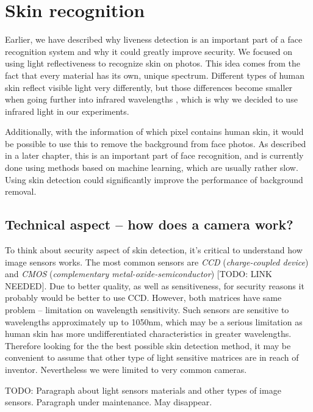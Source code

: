 \chapter{Skin recognition}
    Earlier, we have described why liveness detection is an important part
    of a face recognition system and why it could greatly improve security.
    We focused on using light reflectiveness to recognize skin on photos.
    This idea comes from the fact that every material has its own, unique spectrum.
    Different types of human skin reflect visible light very differently,
    but those differences become smaller when going further into infrared wavelengths
    \cite{visinfra} \cite{toyotaskin}, which is why we decided to use infrared light
    in our experiments.

    Additionally, with the information of which pixel contains human skin,
    it would be possible to use this to remove the background from face photos.
    As described in a later chapter, this is an important part of face recognition,
    and is currently done using methods based on machine learning, which are usually
    rather slow.
    Using skin detection could significantly improve the performance of background
    removal.

    \section{Technical aspect -- how does a camera work?}
        To think about security aspect of skin detection,
        it's critical to understand how image sensors works.
        The most common sensors are \textit{CCD} (\textit{charge-coupled device})
        and \textit{CMOS} (\textit{complementary metal-oxide-semiconductor})
        [TODO: LINK NEEDED].
        Due to better quality, as well as sensitiveness, for security reasons
        it probably would be better to use CCD.
        However, both matrices have same problem -- limitation on wavelength sensitivity.
        Such sensors are sensitive to wavelengths approximately up to 1050nm,
        which may be a serious limitation as human skin has more undifferentiated
        characteristics in greater wavelengths.
        Therefore looking for the the best possible skin detection method,
        it may be convenient to assume that other type of light sensitive matrices
        are in reach of inventor.
        Nevertheless we were limited to very common cameras.

        TODO: Paragraph about light sensors materials and other types of image sensors.
        Paragraph under maintenance. May disappear.

